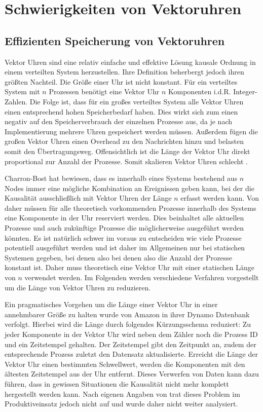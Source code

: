 \section{Schwierigkeiten von Vektoruhren}
\subsection{Effizienten Speicherung von Vektoruhren}
Vektor Uhren sind eine relativ einfache und effektive Lösung kausale Ordnung in einem verteilten System herzustellen.
Ihre Definition beherbergt jedoch ihren größten Nachteil.
Die Größe einer Uhr ist nicht konstant.
Für ein verteiltes System mit $n$ Prozessen benötigt eine Vektor Uhr $n$ Komponenten i.d.R. Integer-Zahlen.
Die Folge ist, dass für ein großes verteiltes System alle Vektor Uhren einen entsprechend hohen Speicherbedarf haben.
Dies wirkt sich zum einen negativ auf den Speicherverbrauch der einzelnen Prozesse aus, da je nach Implementierung mehrere Uhren gespeichert werden müssen.
Außerdem fügen die großen Vektor Uhren einen Overhead zu den Nachrichten hinzu und belasten somit den Übertragungsweg.
Offensichtlich ist die Länge der Vektor Uhr direkt proportional zur Anzahl der Prozesse.
Somit skalieren Vektor Uhren schlecht \cite{torres1999plausible}.

Charron-Bost \cite{charron1990concerning} hat bewiesen, dass es innerhalb eines Systems bestehend aus $n$ Nodes immer eine mögliche Kombination an Ereignissen geben kann, bei der die Kausalität ausschließlich mit Vektor Uhren der Länge $n$ erfasst werden kann.
Von daher müssen für alle theoretisch vorkommenden Prozesse innerhalb des Systems eine Komponente in der Uhr reserviert werden.
Dies beinhaltet alle aktuellen Prozesse und auch zukünftige Prozesse die möglicherweise ausgeführt werden könnten.
Es ist natürlich schwer im voraus zu entscheiden wie viele Prozesse potentiell ausgeführt werden und ist daher im Allgemeinen nur bei statischen Systemen gegeben, bei denen also  bei denen also die Anzahl der Prozesse konstant ist.
Daher muss theoretisch eine Vektor Uhr mit einer statischen Länge von $n$ verwendet werden.
Im Folgenden werden verschiedene Verfahren vorgestellt um die Länge von Vektor Uhren zu reduzieren.

Ein pragmatisches Vorgehen um die Länge einer Vektor Uhr in einer annehmbarer Größe zu halten wurde von Amazon in ihrer Dynamo Datenbank \cite{decandia2007dynamo} verfolgt.
Hierbei wird die Länge durch folgendes Kürzungsschema reduziert:
Zu jeder Komponente in der Vektor Uhr wird neben dem Zähler noch die Prozess ID und ein Zeitstempel gehalten.
Der Zeitstempel gibt den Zeitpunkt an, zudem der entsprechende Prozess zuletzt den Datensatz aktualisierte.
Erreicht die Länge der Vektor Uhr einen bestimmten Schwellwert, werden die Komponenten mit den ältesten Zeitstempel aus der Uhr entfernt.
Dieses Verwerfen von Daten kann dazu führen, dass in gewissen Situationen die Kausalität nicht mehr komplett hergestellt werden kann.
Nach eigenen Angaben von  \cite{decandia2007dynamo} trat dieses Problem im Produktiveinsatz jedoch nicht auf und wurde daher nicht weiter analysiert.

